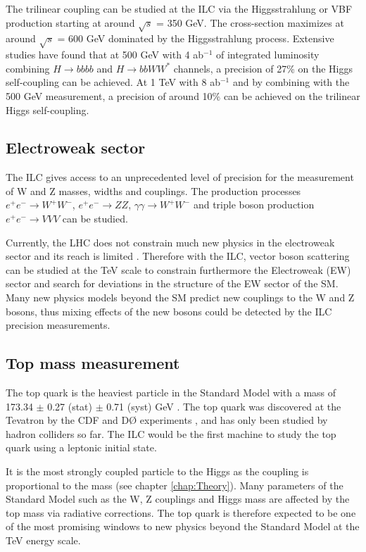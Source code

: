 The trilinear coupling can be studied at the ILC via the Higgsstrahlung or VBF production starting at around $\sqrt{s}$ = 350 GeV. The cross-section maximizes at around $\sqrt{s}$ = 600 GeV dominated by the Higgsstrahlung process. Extensive studies \cite{Duerig:2016dvi, Tian:2013qmi} have found that at 500 GeV with 4 ab$^{-1}$ of integrated luminosity combining $H \rightarrow bbbb$ and $H \rightarrow bbWW^*$ channels, a precision of 27\% on the Higgs self-coupling can be achieved. At 1 TeV with 8 ab$^{-1}$ and by combining with the 500 GeV measurement, a precision of around 10\% can be achieved on the trilinear Higgs self-coupling.

\subsection{Electroweak sector}

The ILC gives access to an unprecedented level of precision for the measurement of W and Z masses, widths and couplings. The production processes $e^+e^- \rightarrow W^+W^-$, $e^+e^- \rightarrow ZZ$, $\gamma\gamma \rightarrow W^+W^-$ and triple boson production $e^+e^- \rightarrow VVV$ can be studied.

Currently, the LHC does not constrain much new physics in the electroweak sector and its reach is limited \cite{Alboteanu:2008my}. Therefore with the ILC, vector boson scattering can be studied at the TeV scale to constrain furthermore the Electroweak (EW) sector and search for deviations in the structure of the EW sector of the SM. Many new physics models beyond the SM predict new couplings to the W and Z bosons, thus mixing effects of the new bosons could be detected by the ILC precision measurements.

\subsection{Top mass measurement}

The top quark is the heaviest particle in the Standard Model with a mass of 173.34 $\pm$ 0.27 (stat) $\pm$ 0.71 (syst) GeV \cite{ATLAS:2014wva}. The top quark was discovered at the Tevatron by the CDF and D\O{} experiments \cite{Abe:1995hr, D0:1995jca}, and has only been studied by hadron colliders so far. The ILC would be the first machine to study the top quark using a leptonic initial state.

It is the most strongly coupled particle to the Higgs as the coupling is proportional to the mass (see chapter \ref{chap:Theory}). Many parameters of the Standard Model such as the W, Z couplings and Higgs mass are affected by the top mass via radiative corrections. The top quark is therefore expected to be one of the most promising windows to new physics beyond the Standard Model at the TeV energy scale.

